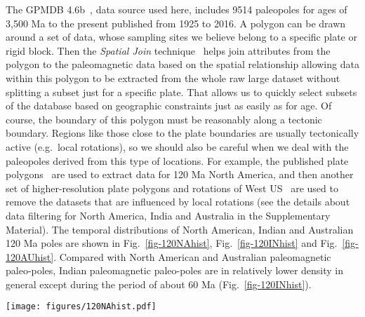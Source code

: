 The GPMDB 4.6b~\cite{P05}, data source used here, includes 9514 paleopoles for
ages of 3,500 Ma to the present published from 1925 to 2016. A polygon can be
drawn around a set of data, whose sampling sites we believe belong to a specific
plate or rigid block. Then the {\em Spatial Join\/} technique~\cite{J07} helps
join attributes from the polygon to the paleomagnetic data based on the spatial
relationship allowing data within this polygon to be extracted from the whole
raw large dataset without splitting a subset just for a specific plate. That
allows us to quickly select subsets of the database based on geographic
constraints just as easily as for age. Of course, the boundary of this polygon
must be reasonably along a tectonic boundary. Regions like those close to the
plate boundaries are usually tectonically active (e.g.\ local rotations), so we
should also be careful when we deal with the paleopoles derived from this type
of locations. For example, the published plate polygons~\cite{Y18} are used to
extract data for 120 Ma North America, and then another set of
higher-resolution plate polygons and rotations of West US~\cite{Mc06} are used
to remove the datasets that are influenced by local rotations (see the details
about data filtering for North America, India and Australia in the Supplementary
Material). The temporal distributions of North American, Indian and Australian
120 Ma poles are shown in Fig.~\ref{fig-120NAhist},
Fig.~\ref{fig-120INhist} and Fig.~\ref{fig-120AUhist}. Compared with North
American and Australian paleomagnetic paleo-poles, Indian paleomagnetic
paleo-poles are in relatively lower density in general except during the period
of about 60 Ma (Fig.~\ref{fig-120INhist}).

\begin{figure*}
\centering
\texttt{[image: figures/120NAhist.pdf]}
\caption[Distribution of 120 Ma North American poles]{Temporal
distribution of 120 Ma $NAC$ (101) paleomagnetic poles in 10 Myr
binning and 5 Myr step. For distribution a, each bin only counts in the
midpoints (circles) of pole error bars (not including those right at bin edges);
For distribution b, as long as the bar intersects with the bin (not including
those intersecting only at one of bin edges), it is counted in. Inside the
parentheses, i means igneous rocks derived (red bars; only two poles,
83 Ma and 80 Ma, from igneous and also sedimentary;
only one pole, 72 Ma, from igneous and also metamorphic), r means
sedimentary rocks with redbeds involved derived (orange bars), and m means
metamorphic rocks derived (blue bars); the left are non-redbed sedimentary rocks
derived (black bars; only two poles, 146 Ma [RESULTNO 6679] and
2 Ma [RESULTNO 1227], are from sedimentary and also metamorphic).
The data published before 1984 are shown as circles with a dot.}\label{fig-120NAhist}
\end{figure*}

